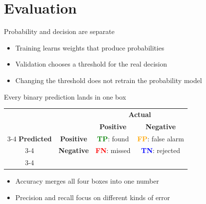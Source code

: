 \documentclass[aspectratio=169,11pt]{beamer}
\newcommand{\key}[1]{\textcolor{Blue}{\textbf{#1}}}
\newcommand{\good}[1]{\textcolor{Green}{\textbf{#1}}}
\newcommand{\bad}[1]{\textcolor{Red}{\textbf{#1}}}
\begin{document}
\section{Evaluation}

\begin{frame}{Probability and decision are separate}
  \begin{center}
  \end{center}
  \vspace{.65cm}
  \begin{itemize}
    \item Training learns weights that produce probabilities
    \item Validation chooses a threshold for the real decision
    \item Changing the threshold does not retrain the probability model
  \end{itemize}
\end{frame}

\begin{frame}{Every binary prediction lands in one box}
  \begin{center}
    \begin{tabular}{cc|c|c|}
      \multicolumn{2}{c}{}&\multicolumn{2}{c}{\textbf{Actual}}\\
      \multicolumn{2}{c}{}&\textbf{Positive}&\textbf{Negative}\\\cline{3-4}
      \textbf{Predicted}&\textbf{Positive}&\good{TP}: found&\textcolor{Orange}{\textbf{FP}}: false alarm\\\cline{3-4}
      &\textbf{Negative}&\bad{FN}: missed&\key{TN}: rejected\\\cline{3-4}
    \end{tabular}
  \end{center}
  \vspace{.6cm}
  \begin{itemize}
    \item Accuracy merges all four boxes into one number
    \item Precision and recall focus on different kinds of error
  \end{itemize}
\end{frame}
\end{document}
